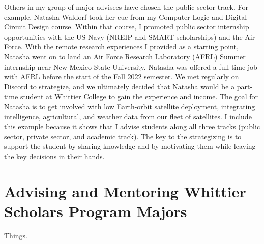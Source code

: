 \documentclass[../../main.tex]{subfiles}
\begin{document}
Others in my group of major advisees have chosen the public sector track.  For example, Natasha Waldorf took her cue from my Computer Logic and Digital Circuit Design course.  Within that course, I promoted public sector internship opportunities with the US Navy (NREIP and SMART scholarships) and the Air Force.  With the remote research experiences I provided as a starting point, Natasha went on to land an Air Force Research Laboratory (AFRL) Summer internship near New Mexico State University.  Natasha was offered a full-time job with AFRL before the start of the Fall 2022 semester.  We met regularly on Discord to strategize, and we ultimately decided that Natasha would be a part-time student at Whittier College to gain the experience and income.  The goal for Natasha is to get involved with low Earth-orbit satellite deployment, integrating intelligence, agricultural, and weather data from our fleet of satellites.  I include this example because it shows that I advise students along all three tracks (public sector, private sector, and academic track).  The key to the strategizing is to support the student by sharing knowledge and by motivating them while leaving the key decisions in their hands.

\section{Advising and Mentoring Whittier Scholars Program Majors}

Things.
\end{document}
